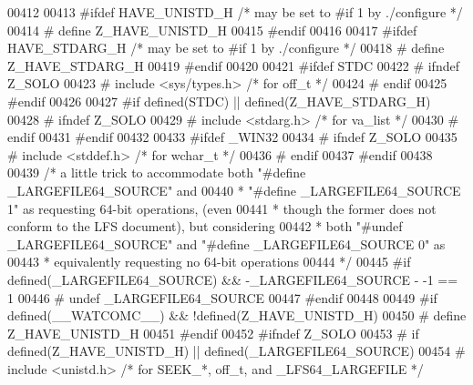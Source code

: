 \begin{DoxyCode}
00412 
00413 \textcolor{preprocessor}{#ifdef HAVE\_UNISTD\_H    }\textcolor{comment}{/* may be set to #if 1 by ./configure */}\textcolor{preprocessor}{}
00414 \textcolor{preprocessor}{#  define Z\_HAVE\_UNISTD\_H}
00415 \textcolor{preprocessor}{#endif}
00416 
00417 \textcolor{preprocessor}{#ifdef HAVE\_STDARG\_H    }\textcolor{comment}{/* may be set to #if 1 by ./configure */}\textcolor{preprocessor}{}
00418 \textcolor{preprocessor}{#  define Z\_HAVE\_STDARG\_H}
00419 \textcolor{preprocessor}{#endif}
00420 
00421 \textcolor{preprocessor}{#ifdef STDC}
00422 \textcolor{preprocessor}{#  ifndef Z\_SOLO}
00423 \textcolor{preprocessor}{#    include <sys/types.h>}      \textcolor{comment}{/* for off\_t */}
00424 \textcolor{preprocessor}{#  endif}
00425 \textcolor{preprocessor}{#endif}
00426 
00427 \textcolor{preprocessor}{#if defined(STDC) || defined(Z\_HAVE\_STDARG\_H)}
00428 \textcolor{preprocessor}{#  ifndef Z\_SOLO}
00429 \textcolor{preprocessor}{#    include <stdarg.h>}         \textcolor{comment}{/* for va\_list */}
00430 \textcolor{preprocessor}{#  endif}
00431 \textcolor{preprocessor}{#endif}
00432 
00433 \textcolor{preprocessor}{#ifdef \_WIN32}
00434 \textcolor{preprocessor}{#  ifndef Z\_SOLO}
00435 \textcolor{preprocessor}{#    include <stddef.h>}         \textcolor{comment}{/* for wchar\_t */}
00436 \textcolor{preprocessor}{#  endif}
00437 \textcolor{preprocessor}{#endif}
00438 
00439 \textcolor{comment}{/* a little trick to accommodate both "#define \_LARGEFILE64\_SOURCE" and}
00440 \textcolor{comment}{ * "#define \_LARGEFILE64\_SOURCE 1" as requesting 64-bit operations, (even}
00441 \textcolor{comment}{ * though the former does not conform to the LFS document), but considering}
00442 \textcolor{comment}{ * both "#undef \_LARGEFILE64\_SOURCE" and "#define \_LARGEFILE64\_SOURCE 0" as}
00443 \textcolor{comment}{ * equivalently requesting no 64-bit operations}
00444 \textcolor{comment}{ */}
00445 \textcolor{preprocessor}{#if defined(\_LARGEFILE64\_SOURCE) && -\_LARGEFILE64\_SOURCE - -1 == 1}
00446 \textcolor{preprocessor}{#  undef \_LARGEFILE64\_SOURCE}
00447 \textcolor{preprocessor}{#endif}
00448 
00449 \textcolor{preprocessor}{#if defined(\_\_WATCOMC\_\_) && !defined(Z\_HAVE\_UNISTD\_H)}
00450 \textcolor{preprocessor}{#  define Z\_HAVE\_UNISTD\_H}
00451 \textcolor{preprocessor}{#endif}
00452 \textcolor{preprocessor}{#ifndef Z\_SOLO}
00453 \textcolor{preprocessor}{#  if defined(Z\_HAVE\_UNISTD\_H) || defined(\_LARGEFILE64\_SOURCE)}
00454 \textcolor{preprocessor}{#    include <unistd.h>}         \textcolor{comment}{/* for SEEK\_*, off\_t, and \_LFS64\_LARGEFILE */}

\end{DoxyCode}
